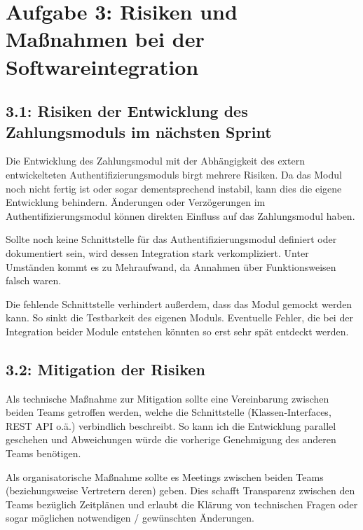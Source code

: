 \section*{Aufgabe 3: Risiken und Maßnahmen bei der Softwareintegration}

\subsection*{3.1: Risiken der Entwicklung des Zahlungsmoduls im nächsten Sprint}

Die Entwicklung des Zahlungsmodul mit der Abhängigkeit des extern entwickelteten Authentifizierungsmoduls birgt mehrere Risiken.
Da das Modul noch nicht fertig ist oder sogar dementsprechend instabil, kann dies die eigene Entwicklung behindern. Änderungen oder Verzögerungen im Authentifizierungsmodul können direkten Einfluss auf das Zahlungsmodul haben.

Sollte noch keine Schnittstelle für das Authentifizierungsmodul definiert oder dokumentiert sein, wird dessen Integration stark verkompliziert. Unter Umständen kommt es zu Mehraufwand, da Annahmen über Funktionsweisen falsch waren.

Die fehlende Schnittstelle verhindert außerdem, dass das Modul gemockt werden kann. So sinkt die Testbarkeit des eigenen Moduls. Eventuelle Fehler, die bei der Integration beider Module entstehen könnten so erst sehr spät entdeckt werden.

\subsection*{3.2: Mitigation der Risiken}

Als technische Maßnahme zur Mitigation sollte eine Vereinbarung zwischen beiden Teams getroffen werden, welche die Schnittstelle (Klassen-Interfaces, REST API o.ä.) verbindlich beschreibt. So kann ich die Entwicklung parallel geschehen und Abweichungen würde die vorherige Genehmigung des anderen Teams benötigen.

Als organisatorische Maßnahme sollte es Meetings zwischen beiden Teams (beziehungsweise Vertretern deren) geben.
Dies schafft Transparenz zwischen den Teams bezüglich Zeitplänen und erlaubt die Klärung von technischen Fragen oder sogar möglichen notwendigen / gewünschten Änderungen.